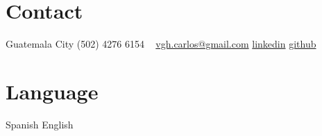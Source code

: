\documentclass[]{friggeri-cv} %
\begin{document}


\begin{aside} %
\section{Contact}
Guatemala City
(502) 4276 6154
~
\href{mailto:vgh.carlos@gmail.com}{vgh.carlos@gmail.com}
\href{https://www.linkedin.com/pub/carlos-hern\%C3\%A1ndez/87/1b1/157}{linkedin}
\href{https://github.com/learnercys}{github}
\section{Language}
Spanish
English
\end{aside}


\end{document}
